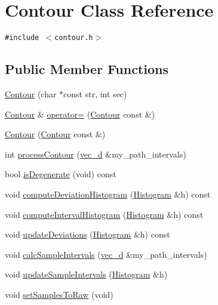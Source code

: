 \hypertarget{classContour}{
\section{Contour Class Reference}
\label{classContour}
}
{\tt \#include $<$contour.h$>$}

\subsection*{Public Member Functions}
\begin{CompactItemize}
\item 
\hyperlink{classContour_7b0cf79d396376bb151107ea681bcc8c}{Contour} (char $\ast$const str, int sec)
\item 
\hyperlink{classContour}{Contour} \& \hyperlink{classContour_43544e1600bf1ad9089280acf0d00f49}{operator=} (\hyperlink{classContour}{Contour} const \&)
\item 
\hyperlink{classContour_c932ba1508409956282d1c0edc33b423}{Contour} (\hyperlink{classContour}{Contour} const \&)
\item 
int \hyperlink{classContour_e6c12c88060f02914f324d3c446ea536}{processContour} (\hyperlink{histogram_8h_db0ab3db1ab685e2d2bff657e3e86861}{vec\_\-d} \&my\_\-path\_\-intervals)
\item 
bool \hyperlink{classContour_efb2ebf2825a536726a22810e814d493}{isDegenerate} (void) const 
\item 
void \hyperlink{classContour_bed58a39b4082fb527aaf9c50f7f31f0}{computeDeviationHistogram} (\hyperlink{classHistogram}{Histogram} \&h) const 
\item 
void \hyperlink{classContour_b6aef0a09131e1ed47a64378373a4571}{computeIntervalHistogram} (\hyperlink{classHistogram}{Histogram} \&h) const 
\item 
void \hyperlink{classContour_bfbd206df1ad7a511a0144ae866d2432}{updateDeviations} (\hyperlink{classHistogram}{Histogram} \&h) const 
\item 
void \hyperlink{classContour_331624a8a963efe4b50d58d94010fbd3}{calcSampleIntervals} (\hyperlink{histogram_8h_db0ab3db1ab685e2d2bff657e3e86861}{vec\_\-d} \&my\_\-path\_\-intervals)
\item 
void \hyperlink{classContour_08ac24e5771e503f0f79803e54439c75}{updateSampleIntervals} (\hyperlink{classHistogram}{Histogram} \&h)
\item 
void \hyperlink{classContour_f2218507768d03029d77e076ba793fd5}{setSamplesToRaw} (void)
\item 

\end{CompactItemize}
